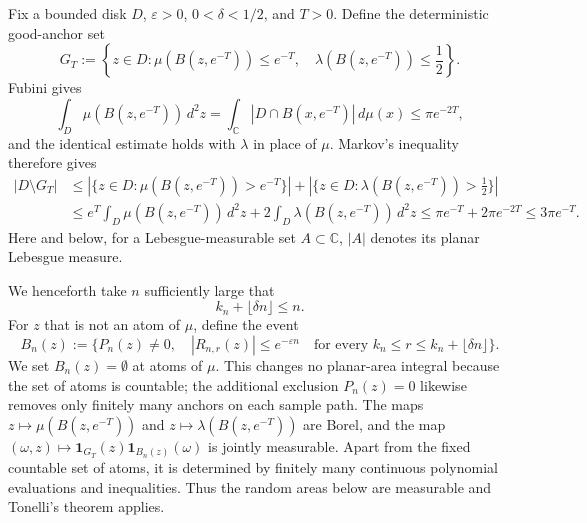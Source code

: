 \documentclass[10pt,reqno]{amsart}
\theoremstyle{remark}
\newcommand{\C}{\mathbb C}
\begin{document}
Fix a bounded disk $D$, $\varepsilon>0$, $0<\delta<1/2$, and $T>0$. Define the deterministic good-anchor set
\[G_T:=\left\{z\in D: \mu(B(z,e^{-T}))\le e^{-T},\quad \lambda(B(z,e^{-T}))\le\frac{1}{2}\right\}.\] Fubini gives
\[\int_D \mu(B(z,e^{-T}))\,d^2z=\int_\C|D\cap B(x,e^{-T})|\,d\mu(x)\le \pi e^{-2T},\]
and the identical estimate holds with $\lambda$ in place of $\mu$. Markov's inequality therefore gives
\begin{equation}\label{eq:bad-size-bound}
\begin{aligned}
|D\setminus G_T|
&\le \left|\{z\in D:\mu(B(z,e^{-T}))>e^{-T}\}\right|
+\left|\{z\in D:\lambda(B(z,e^{-T}))>\tfrac12\}\right|\\
&\le e^T\int_D\mu(B(z,e^{-T}))\,d^2z 
+ 2\int_D\lambda(B(z,e^{-T}))\,d^2z
\le \pi e^{-T}+2\pi e^{-2T}
\le 3\pi e^{-T}.
\end{aligned}
\end{equation}
Here and below, for a Lebesgue-measurable set $A\subset\C$, $|A|$ denotes its planar Lebesgue measure. 

We henceforth take $n$ sufficiently large that 
\[k_n+\lfloor \delta n\rfloor\le n.\] For $z$ that is not an atom of $\mu$, define the event
\[B_n(z):=\{P_n(z)\neq 0, \quad
|R_{n,r}(z)|\le e^{-\varepsilon n} \quad\text{for every }
k_n\le r\le k_n+\lfloor \delta n\rfloor\}.\]
We set $B_n(z)=\emptyset$ at atoms of $\mu$. This changes no planar-area integral because the set of atoms is countable; the additional exclusion $P_n(z)=0$ likewise removes only finitely many anchors on each sample path. The maps $z\mapsto \mu(B(z,e^{-T}))$ and $z\mapsto \lambda(B(z,e^{-T}))$ are Borel, and the map $(\omega,z)\mapsto \mathbf{1}_{G_T}(z)\mathbf{1}_{B_n(z)}(\omega)$ is jointly measurable. Apart from the fixed countable set of atoms, it is determined by finitely many continuous polynomial evaluations and inequalities. Thus the random areas below are measurable and Tonelli's theorem applies.
\end{document}
